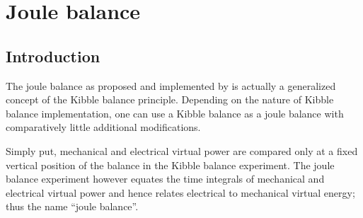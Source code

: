 \documentclass{report}
\numberwithin{tm}{section}
\begin{document}
\chapter{Joule balance}
\section{Introduction}
The joule balance as proposed and implemented by \cite{Xu_2016} is actually a generalized concept of the Kibble balance principle. Depending on the nature of Kibble balance implementation, one can use a Kibble balance as a joule balance with comparatively little additional modifications. 

Simply put, mechanical and electrical virtual power are compared only at a fixed vertical position of the balance in the Kibble balance experiment. The joule balance experiment however equates the time integrals of mechanical and electrical virtual power and hence relates electrical to mechanical virtual energy; thus the name ``joule balance''.

\end{document}
